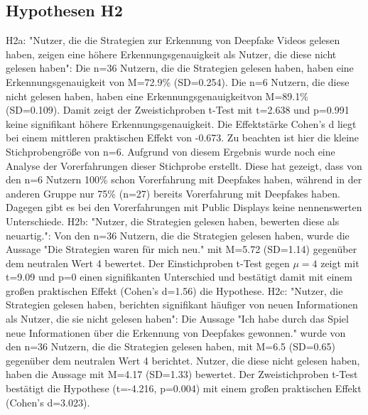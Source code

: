 \subsection{Hypothesen H2}
H2a: "Nutzer, die die Strategien zur Erkennung von Deepfake Videos gelesen haben, zeigen eine höhere Erkennungsgenauigkeit als Nutzer, die diese nicht gelesen haben":
Die n=36 Nutzern, die die Strategien gelesen haben, haben eine Erkennungsgenauigkeit von M=72.9\% (SD=0.254). 
Die n=6 Nutzern, die diese nicht gelesen haben, haben eine Erkennungsgenauigkeitvon M=89.1\% (SD=0.109). 
Damit zeigt der Zweistichproben t-Test mit t=2.638 und p=0.991 keine signifikant höhere Erkennungsgenauigkeit. 
Die Effektstärke Cohen's d liegt bei einem mittleren praktischen Effekt von -0.673. 
Zu beachten ist hier die kleine Stichprobengröße von n=6. 
Aufgrund von diesem Ergebnis wurde noch eine Analyse der Vorerfahrungen dieser Stichprobe erstellt. 
Diese hat gezeigt, dass von den n=6 Nutzern 100\% schon Vorerfahrung mit Deepfakes haben, 
während in der anderen Gruppe nur 75\% (n=27) bereits Vorerfahrung mit Deepfakes haben. 
Dagegen gibt es bei den Vorerfahrungen mit Public Displays keine nennenswerten Unterschiede.
H2b: "Nutzer, die Strategien gelesen haben, bewerten diese als neuartig.":
Von den n=36 Nutzern, die die Strategien gelesen haben, wurde die Aussage "Die Strategien waren für mich neu." 
mit M=5.72 (SD=1.14) gegenüber dem neutralen Wert 4 bewertet. 
Der Einstichproben t-Test gegen $\mu=4$ zeigt mit t=9.09 und p=0 einen signifikanten Unterschied 
und bestätigt damit mit einem großen praktischen Effekt (Cohen's d=1.56) die Hypothese.
H2c: "Nutzer, die Strategien gelesen haben, berichten signifikant häufiger von neuen Informationen als Nutzer, die sie nicht gelesen haben":
Die Aussage "Ich habe durch das Spiel neue Informationen über die Erkennung von Deepfakes gewonnen." 
wurde von den n=36 Nutzern, die die Strategien gelesen haben, mit M=6.5 (SD=0.65) gegenüber dem neutralen Wert 4 berichtet. 
Nutzer, die diese nicht gelesen haben, haben die Aussage mit M=4.17 (SD=1.33) bewertet. 
Der Zweistichproben t-Test bestätigt die Hypothese (t=-4.216, p=0.004) mit einem großen praktischen Effekt (Cohen's d=3.023).

